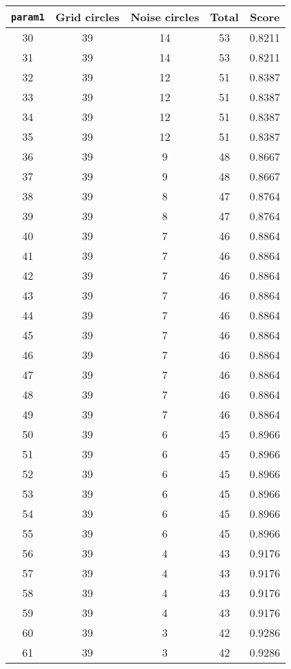\documentclass[letterpaper, 12pt]{article}
\begin{document}
\begin{longtable}{|c|c|c|c|c|}
\hline
\textbf{\texttt{param1}} & \textbf{Grid circles} & \textbf{Noise circles} & \textbf{Total} & \textbf{Score} \\
\hline
30 & 39 & 14 & 53 & 0.8211 \\
\hline
31 & 39 & 14 & 53 & 0.8211 \\
\hline
32 & 39 & 12 & 51 & 0.8387 \\
\hline
33 & 39 & 12 & 51 & 0.8387 \\
\hline
34 & 39 & 12 & 51 & 0.8387 \\
\hline
35 & 39 & 12 & 51 & 0.8387 \\
\hline
36 & 39 & 9 & 48 & 0.8667 \\
\hline
37 & 39 & 9 & 48 & 0.8667 \\
\hline
38 & 39 & 8 & 47 & 0.8764 \\
\hline
39 & 39 & 8 & 47 & 0.8764 \\
\hline
40 & 39 & 7 & 46 & 0.8864 \\
\hline
41 & 39 & 7 & 46 & 0.8864 \\
\hline
42 & 39 & 7 & 46 & 0.8864 \\
\hline
43 & 39 & 7 & 46 & 0.8864 \\
\hline
44 & 39 & 7 & 46 & 0.8864 \\
\hline
45 & 39 & 7 & 46 & 0.8864 \\
\hline
46 & 39 & 7 & 46 & 0.8864 \\
\hline
47 & 39 & 7 & 46 & 0.8864 \\
\hline
48 & 39 & 7 & 46 & 0.8864 \\
\hline
49 & 39 & 7 & 46 & 0.8864 \\
\hline
50 & 39 & 6 & 45 & 0.8966 \\
\hline
51 & 39 & 6 & 45 & 0.8966 \\
\hline
52 & 39 & 6 & 45 & 0.8966 \\
\hline
53 & 39 & 6 & 45 & 0.8966 \\
\hline
54 & 39 & 6 & 45 & 0.8966 \\
\hline
55 & 39 & 6 & 45 & 0.8966 \\
\hline
56 & 39 & 4 & 43 & 0.9176 \\
\hline
57 & 39 & 4 & 43 & 0.9176 \\
\hline
58 & 39 & 4 & 43 & 0.9176 \\
\hline
59 & 39 & 4 & 43 & 0.9176 \\
\hline
60 & 39 & 3 & 42 & 0.9286 \\
\hline
61 & 39 & 3 & 42 & 0.9286 \\

\end{longtable}
\end{document}
